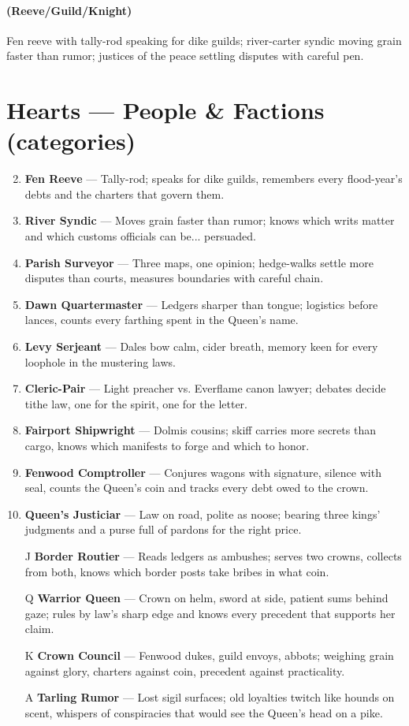 \paragraph*{(Reeve/Guild/Knight)} Fen reeve with tally-rod speaking for dike guilds; river-carter syndic moving grain faster than rumor; justices of the peace settling disputes with careful pen.

\section*{Hearts --- People \& Factions (categories)}
\label{sec:viterra-people}
\begin{enumerate}
\setcounter{enumi}{1}
\item \textbf{Fen Reeve} --- Tally-rod; speaks for dike guilds, remembers every flood-year's debts and the charters that govern them.
\item \textbf{River Syndic} --- Moves grain faster than rumor; knows which writs matter and which customs officials can be... persuaded.
\item \textbf{Parish Surveyor} --- Three maps, one opinion; hedge-walks settle more disputes than courts, measures boundaries with careful chain.
\item \textbf{Dawn Quartermaster} --- Ledgers sharper than tongue; logistics before lances, counts every farthing spent in the Queen's name.
\item \textbf{Levy Serjeant} --- Dales bow calm, cider breath, memory keen for every loophole in the mustering laws.
\item \textbf{Cleric-Pair} --- Light preacher vs. Everflame canon lawyer; debates decide tithe law, one for the spirit, one for the letter.
\item \textbf{Fairport Shipwright} --- Dolmis cousins; skiff carries more secrets than cargo, knows which manifests to forge and which to honor.
\item \textbf{Fenwood Comptroller} --- Conjures wagons with signature, silence with seal, counts the Queen's coin and tracks every debt owed to the crown.
\item \textbf{Queen's Justiciar} --- Law on road, polite as noose; bearing three kings' judgments and a purse full of pardons for the right price.
\item[J] \textbf{Border Routier} --- Reads ledgers as ambushes; serves two crowns, collects from both, knows which border posts take bribes in what coin.
\item[Q] \textbf{Warrior Queen} --- Crown on helm, sword at side, patient sums behind gaze; rules by law's sharp edge and knows every precedent that supports her claim.
\item[K] \textbf{Crown Council} --- Fenwood dukes, guild envoys, abbots; weighing grain against glory, charters against coin, precedent against practicality.
\item[A] \textbf{Tarling Rumor} --- Lost sigil surfaces; old loyalties twitch like hounds on scent, whispers of conspiracies that would see the Queen's head on a pike.
\end{enumerate}

